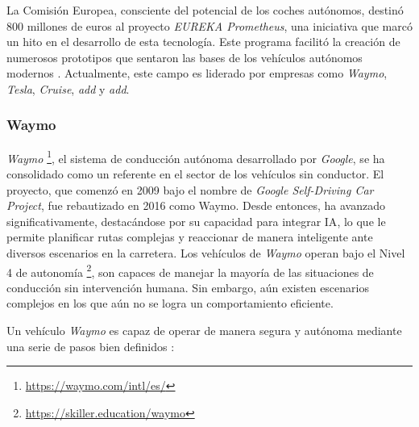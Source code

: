 La Comisión Europea, consciente del potencial de los coches autónomos, destinó 800 millones de euros al proyecto  \textit{EUREKA Prometheus}, una iniciativa que marcó un hito en el desarrollo de esta tecnología. Este programa facilitó la creación de numerosos prototipos que sentaron las bases de los vehículos autónomos modernos \cite{history-vehicles}. Actualmente, este campo es liderado por empresas como \textit{Waymo}, \textit{Tesla}, \textit{Cruise}, \textit{add}  y \textit{add}.

\subsubsection{Waymo}

\textit{ Waymo} \footnote{\url{https://waymo.com/intl/es/}}, el sistema de conducción autónoma desarrollado por \textit{ Google}, se ha consolidado como un referente en el sector de los vehículos sin conductor. El proyecto, que comenzó en 2009 bajo el nombre de \textit{ Google Self-Driving Car Project}, fue rebautizado en 2016 como {Waymo}. Desde entonces, ha avanzado significativamente, destacándose por su capacidad para integrar \ac{IA}, lo que le permite planificar rutas complejas y reaccionar de manera inteligente ante diversos escenarios en la carretera. Los vehículos de \textit{Waymo} operan bajo el Nivel 4 de autonomía \footnote{\url { https://skiller.education/waymo}}, son capaces de manejar la mayoría de las situaciones de conducción sin intervención humana. Sin embargo, aún existen escenarios complejos en los que aún no se logra un comportamiento eficiente.

Un vehículo \textit{Waymo} es capaz de operar de manera segura y autónoma mediante una serie de pasos bien definidos \cite{ai-self-driving-cars}:

